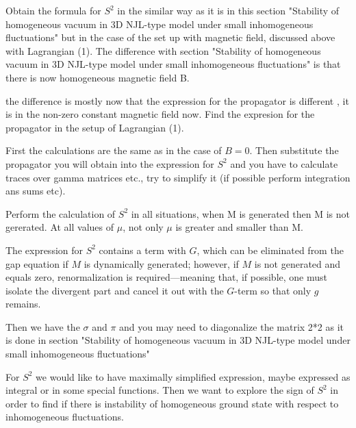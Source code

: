 \documentclass[12pt,a4paper]{article}
\begin{document}
Obtain the formula for $S^2$ in the similar way as it is in this section "Stability of homogeneous vacuum in 3D NJL-type model under small inhomogeneous
fluctuations" but in the case of the set up with magnetic field, discussed above with Lagrangian (1). The difference with section "Stability of homogeneous vacuum in 3D NJL-type model under small inhomogeneous
fluctuations" is that there is now homogeneous magnetic field B.


 the difference is mostly now that the expression for the propagator is different , it is in the non-zero constant magnetic field now. Find the expresion for the propagator in the setup of Lagrangian (1).

 First the calculations are the same as in the case of $B=0$.
Then substitute the propagator you will obtain into the expression for $S^2$ and you have to calculate traces over gamma matrices etc., try to simplify it (if possible perform integration ans sums etc).

Perform the calculation of $S^2$ in all situations, when M is generated then M is not gererated. At all values of $\mu$, not only $\mu$ is greater and smaller than M.

The expression for $S^{2}$ contains a term with \(G\), which can be eliminated from the gap equation if \(M\) is dynamically generated; however, if \(M\) is not generated and equals zero, renormalization is required—meaning that, if possible, one must isolate the divergent part and cancel it out with the \(G\)-term so that only \(g\) remains.

Then we have the $\sigma$ and $\pi$ and you may need to diagonalize the matrix 2*2 as it is done in section "Stability of homogeneous vacuum in 3D NJL-type model under small inhomogeneous
fluctuations"

For $S^2$ we would like to have maximally simplified expression, maybe expressed as integral or in some special functions. Then we want to explore the sign of $S^2$ in order to find if there is instability of homogeneous ground state with respect to inhomogeneous fluctuations.
\end{document}
